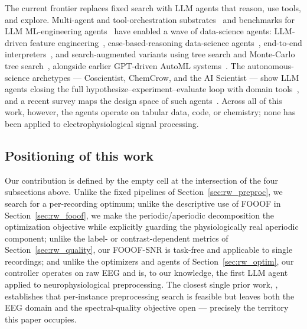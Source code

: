 The current frontier replaces fixed search with LLM agents that reason, use tools, and explore. Multi-agent and tool-orchestration substrates~\cite{WuEtAl2023, ShenEtAl2023} and benchmarks for LLM ML-engineering agents~\cite{HuangEtAl2023} have enabled a wave of data-science agents: LLM-driven feature engineering~\cite{HollmannEtAl2023}, case-based-reasoning data-science agents~\cite{GuoEtAl2024}, end-to-end interpreters~\cite{HongEtAl2024}, and search-augmented variants using tree search and Monte-Carlo tree search~\cite{JiangEtAl2025, ChiEtAl2024, TriratEtAl2024}, alongside earlier GPT-driven AutoML systems~\cite{ZhangEtAl2023, TsaiEtAl2023}. The autonomous-science archetypes --- Coscientist, ChemCrow, and the AI Scientist --- show LLM agents closing the full hypothesize--experiment--evaluate loop with domain tools~\cite{BoikoEtAl2023, BranEtAl2024, LuEtAl2024}, and a recent survey maps the design space of such agents~\cite{WangEtAl2024}. Across all of this work, however, the agents operate on tabular data, code, or chemistry; none has been applied to electrophysiological signal processing.

\subsection{Positioning of this work}
\label{sec:rw_position}

Our contribution is defined by the empty cell at the intersection of the four subsections above. Unlike the fixed pipelines of Section~\ref{sec:rw_preproc}, we search for a per-recording optimum; unlike the descriptive use of FOOOF in Section~\ref{sec:rw_fooof}, we make the periodic/aperiodic decomposition the optimization objective while explicitly guarding the physiologically real aperiodic component; unlike the label- or contrast-dependent metrics of Section~\ref{sec:rw_quality}, our FOOOF-SNR is task-free and applicable to single recordings; and unlike the optimizers and agents of Section~\ref{sec:rw_optim}, our controller operates on raw EEG and is, to our knowledge, the first LLM agent applied to neurophysiological preprocessing. The closest single prior work, \citet{MartinezEtAl2023}, establishes that per-instance preprocessing search is feasible but leaves both the EEG domain and the spectral-quality objective open --- precisely the territory this paper occupies.
